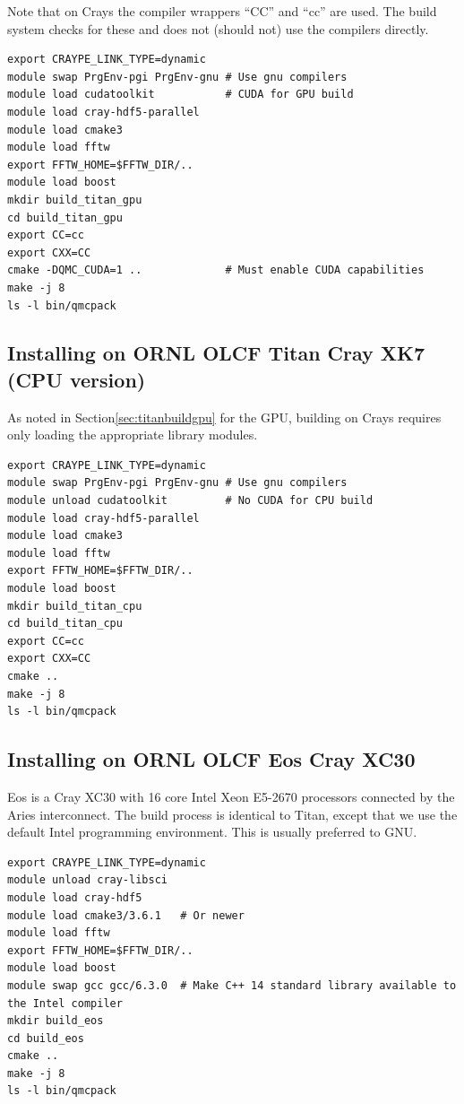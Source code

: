 Note that on Crays the compiler wrappers ``CC'' and ``cc'' are
used. The build system checks for these and does not (should not) use
the compilers directly.

\verbatimfont{\footnotesize}%
\begin{verbatim}
export CRAYPE_LINK_TYPE=dynamic
module swap PrgEnv-pgi PrgEnv-gnu # Use gnu compilers
module load cudatoolkit           # CUDA for GPU build
module load cray-hdf5-parallel
module load cmake3
module load fftw
export FFTW_HOME=$FFTW_DIR/..
module load boost
mkdir build_titan_gpu
cd build_titan_gpu
export CC=cc
export CXX=CC
cmake -DQMC_CUDA=1 ..             # Must enable CUDA capabilities
make -j 8
ls -l bin/qmcpack
\end{verbatim}

\subsection{Installing on ORNL OLCF Titan Cray XK7 (CPU version)}
As noted in Section\ref{sec:titanbuildgpu} for the GPU, building on
Crays requires only loading the appropriate library modules.

\verbatimfont{\footnotesize}%
\begin{verbatim}
export CRAYPE_LINK_TYPE=dynamic
module swap PrgEnv-pgi PrgEnv-gnu # Use gnu compilers
module unload cudatoolkit         # No CUDA for CPU build
module load cray-hdf5-parallel
module load cmake3
module load fftw
export FFTW_HOME=$FFTW_DIR/..
module load boost
mkdir build_titan_cpu
cd build_titan_cpu
export CC=cc
export CXX=CC
cmake ..
make -j 8
ls -l bin/qmcpack
\end{verbatim}

\subsection{Installing on ORNL OLCF Eos Cray XC30}
Eos is a Cray XC30 with 16 core Intel Xeon E5-2670 processors connected
by the Aries interconnect. The build process is identical to Titan,
except that we use the default Intel programming environment. This is
usually preferred to GNU.
\verbatimfont{\footnotesize}
\begin{verbatim}
export CRAYPE_LINK_TYPE=dynamic
module unload cray-libsci
module load cray-hdf5
module load cmake3/3.6.1   # Or newer
module load fftw
export FFTW_HOME=$FFTW_DIR/..
module load boost
module swap gcc gcc/6.3.0  # Make C++ 14 standard library available to the Intel compiler
mkdir build_eos
cd build_eos
cmake ..
make -j 8
ls -l bin/qmcpack
\end{verbatim}

